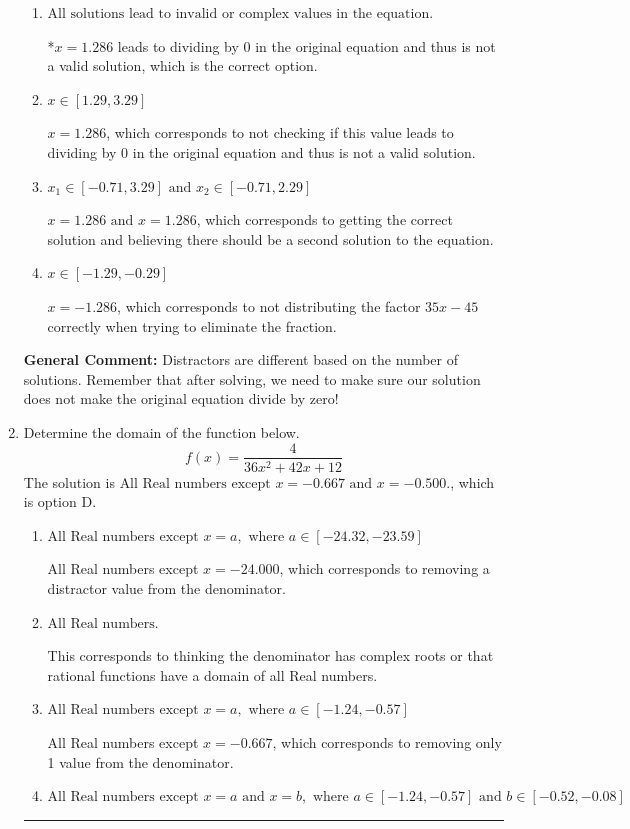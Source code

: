 \documentclass{extbook}[14pt]
\newcommand{\litem}[1]{\item #1

\rule{\textwidth}{0.4pt}}
\begin{document}
\begin{enumerate}
{\begin{enumerate}[label=\Alph*.]
$x = -1.286 \text{ and } x = 1.286$, which corresponds to getting the correct solution and believing there should be a second solution to the equation.
\item \( \text{All solutions lead to invalid or complex values in the equation.} \)

*$x = 1.286$ leads to dividing by 0 in the original equation and thus is not a valid solution, which is the correct option.
\item \( x \in [1.29,3.29] \)

$x = 1.286$, which corresponds to not checking if this value leads to dividing by 0 in the original equation and thus is not a valid solution.
\item \( x_1 \in [-0.71, 3.29] \text{ and } x_2 \in [-0.71,2.29] \)

$x = 1.286 \text{ and } x = 1.286$, which corresponds to getting the correct solution and believing there should be a second solution to the equation.
\item \( x \in [-1.29,-0.29] \)

$x = -1.286$, which corresponds to not distributing the factor $35x -45$ correctly when trying to eliminate the fraction.
\end{enumerate}

\textbf{General Comment:} Distractors are different based on the number of solutions. Remember that after solving, we need to make sure our solution does not make the original equation divide by zero!
}
\litem{
Determine the domain of the function below.
\[ f(x) = \frac{4}{36x^{2} +42 x + 12} \]The solution is \( \text{All Real numbers except } x = -0.667 \text{ and } x = -0.500. \), which is option D.\begin{enumerate}[label=\Alph*.]
\item \( \text{All Real numbers except } x = a, \text{ where } a \in [-24.32, -23.59] \)

All Real numbers except $x = -24.000$, which corresponds to removing a distractor value from the denominator.
\item \( \text{All Real numbers.} \)

This corresponds to thinking the denominator has complex roots or that rational functions have a domain of all Real numbers.
\item \( \text{All Real numbers except } x = a, \text{ where } a \in [-1.24, -0.57] \)

All Real numbers except $x = -0.667$, which corresponds to removing only 1 value from the denominator.
\item \( \text{All Real numbers except } x = a \text{ and } x = b, \text{ where } a \in [-1.24, -0.57] \text{ and } b \in [-0.52, -0.08] \)


\end{enumerate}}
\end{enumerate}
\end{document}
